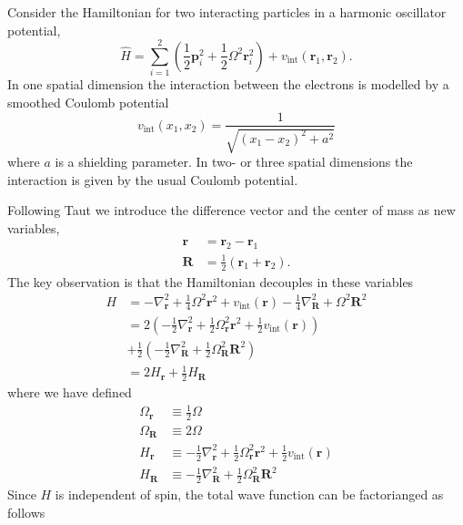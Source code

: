 \documentclass[aip,jcp,reprint,floatfix]{revtex4-1}
\begin{document}
\begin{appendices}
Consider the Hamiltonian for two interacting particles in a harmonic oscillator potential, 
\begin{equation}
    \hat{H} = \sum_{i=1}^2 \left(\frac{1}{2} \mathbf{p}_i^2 + \frac{1}{2} \Omega^2 \mathbf{r}_i^2\right) + v_{\text{int}}(\mathbf{r}_1,\mathbf{r}_2). 
\end{equation}
In one spatial dimension the interaction between the electrons is modelled by a smoothed Coulomb potential \cite{SmoothedCoulomb} 
\begin{equation}
    v_{\text{int}}(x_1,x_2) = \frac{1}{\sqrt{(x_1-x_2)^2 + a^2}}
\end{equation}
where $a$ is a shielding parameter. In two- or three spatial dimensions the interaction is given by the usual Coulomb potential.

Following Taut \cite{Taut93} we introduce the difference vector and the center of mass as new variables,
\begin{align}
    \mathbf{r} &= \mathbf{r}_2-\mathbf{r}_1 \\
    \mathbf{R} &= \frac{1}{2} \left( \mathbf{r}_1+\mathbf{r}_2 \right). 
\end{align}
The key observation is that the Hamiltonian decouples in these variables
\begin{align}
    H &= - \nabla_\mathbf{r}^2 + \frac{1}{4} \Omega^2 \mathbf{r}^2 + v_{\text{int}}(\mathbf{r})  - \frac{1}{4}\nabla_\mathbf{R}^2 + \Omega^2 \mathbf{R}^2 \nonumber \\
    &= 2 \left( -\frac{1}{2} \nabla_\mathbf{r}^2 + \frac{1}{2} \Omega_\mathbf{r}^2 \mathbf{r}^2 + \frac{1}{2}v_{\text{int}}(\mathbf{r}) \right) \nonumber \\  &+ \frac{1}{2} \left( -\frac{1}{2}\nabla_\mathbf{R}^2 + \frac{1}{2}\Omega_\mathbf{R}^2 \mathbf{R}^2 \right) \nonumber \\
    &= 2 H_\mathbf{r} + \frac{1}{2}H_\mathbf{R} 
\end{align}
where we have defined 
\begin{align}
    \Omega_\mathbf{r} &\equiv \frac{1}{2}\Omega \\
    \Omega_\mathbf{R} &\equiv 2 \Omega \\
    H_\mathbf{r} &\equiv -\frac{1}{2} \nabla_\mathbf{r}^2   + \frac{1}{2} \Omega_\mathbf{r}^2 \mathbf{r}^2 + \frac{1}{2}v_{\text{int}}(\mathbf{r}) \\
    H_\mathbf{R} &\equiv -\frac{1}{2}\nabla_\mathbf{R}^2 + \frac{1}{2}\Omega_\mathbf{R}^2 \mathbf{R}^2
\end{align}
Since $H$ is independent of spin, the total wave function can be factorianged as follows\cite{Taut93} 

\end{appendices}
\end{document}
